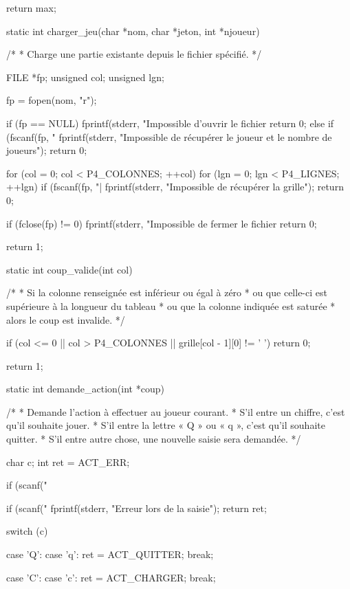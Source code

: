 \begin{C}
{    return max;
}


static int charger_jeu(char *nom, char *jeton, int *njoueur)
{
    /*
     * Charge une partie existante depuis le fichier spécifié.
     */

    FILE *fp;
    unsigned col;
    unsigned lgn;

    fp = fopen(nom, "r");

    if (fp == NULL)
    {
        fprintf(stderr, "Impossible d'ouvrir le fichier %
        return 0;
    }
    else if (fscanf(fp, "%
    {
        fprintf(stderr, "Impossible de récupérer le joueur et le nombre de joueurs\n");
        return 0;
    }

    for (col = 0; col < P4_COLONNES; ++col)
        for (lgn = 0; lgn < P4_LIGNES; ++lgn)
        {
            if (fscanf(fp, "|%
            {
                fprintf(stderr, "Impossible de récupérer la grille\n");
                return 0;
            }
        }

    if (fclose(fp) != 0)
    {
        fprintf(stderr, "Impossible de fermer le fichier %
        return 0;
    }
    
    return 1;
}


static int coup_valide(int col)
{
    /*
     * Si la colonne renseignée est inférieur ou égal à zéro
     * ou que celle-ci est supérieure à la longueur du tableau
     * ou que la colonne indiquée est saturée
     * alors le coup est invalide.
     */

    if (col <= 0 || col > P4_COLONNES || grille[col - 1][0] != ' ')
        return 0;

    return 1;
}


static int demande_action(int *coup)
{
    /*
     * Demande l'action à effectuer au joueur courant.
     * S'il entre un chiffre, c'est qu'il souhaite jouer.
     * S'il entre la lettre « Q » ou « q », c'est qu'il souhaite quitter.
     * S'il entre autre chose, une nouvelle saisie sera demandée.
     */

    char c;
    int ret = ACT_ERR;

    if (scanf("%
    {
        if (scanf("%
        {
            fprintf(stderr, "Erreur lors de la saisie\n");
            return ret;
        }

        switch (c)
        {
        case 'Q':
        case 'q':
            ret = ACT_QUITTER;
            break;

        case 'C':
        case 'c':
            ret = ACT_CHARGER;
            break;

}}}
\end{C}
